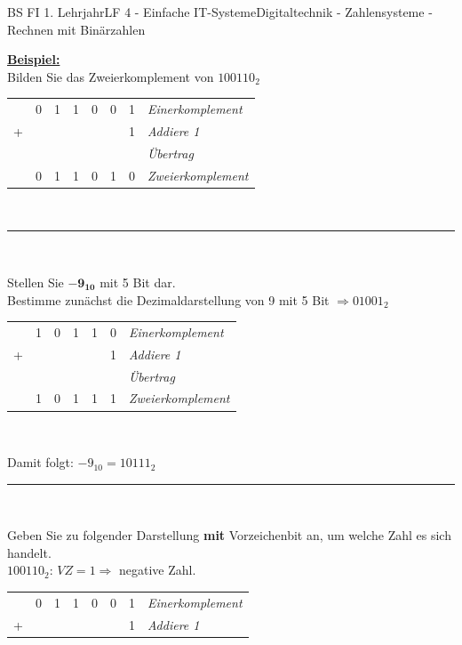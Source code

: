 \documentclass[11pt,twocolumn,oneside,openany,headings=optiontotoc,11pt,numbers=noenddot]{article}
\begin{document}
\begin{worksheet}{BS FI 1. Lehrjahr}{LF 4 - Einfache IT-Systeme}{Digitaltechnik - Zahlensysteme - Rechnen mit Binärzahlen}
		\par\noindent
		\textbf{\underline{Beispiel:}}\\
		Bilden Sie das Zweierkomplement von \(100110_2\)\\
		\begin{tabularx}{0.48\textwidth}{rllllll|l}
			& 0 & 1 & 1 & 0 & 0 & 1 & \textit{Einerkomplement}\\
			+ & & & & & & 1 & \textit{Addiere 1}\\
			& & & & &  \color{codegray}{\tiny{1}} & & \textit{\tiny{Übertrag}}\normalsize\\
			\cline{1-8}
			& 0 & 1 & 1 & 0 & 1 & 0 & \textit{Zweierkomplement}
		\end{tabularx}\\
		\par\noindent
		\rule{0.48\textwidth}{0.1pt}\\
		\par\noindent
		Stellen Sie \(\mathbf{-9_{10}}\) mit 5 Bit dar.\\
		Bestimme zunächst die Dezimaldarstellung von 9 mit 5 Bit \(\Rightarrow 01001_2\)\\
		\par\noindent
		\begin{tabularx}{0.48\textwidth}{rlllll|l}
			& 1 & 0 & 1 & 1 & 0 & \textit{Einerkomplement}\\
			+ & & & & & 1 & \textit{Addiere 1}\\
			& & & & & & \textit{\tiny{Übertrag}}\normalsize\\
			\cline{1-7}
			& 1 & 0 & 1 & 1 & 1 & \textit{Zweierkomplement}
		\end{tabularx}\\
		\par\noindent
		Damit folgt: \(-9_{10} = 10111_{2}\)\\
		\par\noindent
		\rule{0.48\textwidth}{0.1pt}\\
		\par\noindent
		Geben Sie zu folgender Darstellung \textbf{mit} Vorzeichenbit an, um welche Zahl es sich handelt.\\
		\colorbox{green!10}{\(1\)}\(00110_{2}\): \(VZ = 1 \Rightarrow \) negative Zahl.\\
		\par\noindent
		\begin{tabularx}{0.48\textwidth}{rllllll|l}
			& 0 & 1 & 1 & 0 & 0 & 1 & \textit{Einerkomplement}\\
			+ & & & & & & 1 & \textit{Addiere 1}\\

\end{tabularx}
\end{worksheet}
\end{document}
